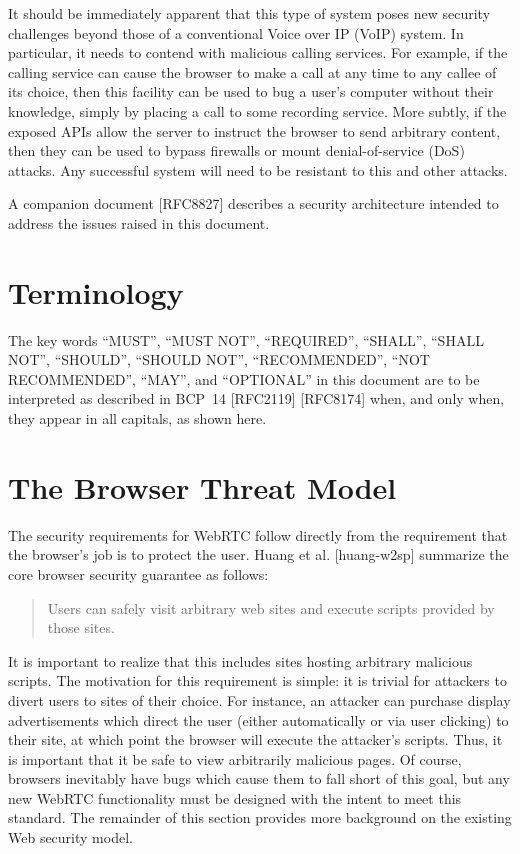 \documentclass{article}
\begin{document}
It should be immediately apparent that this type of system poses new
security challenges beyond those of a conventional Voice over IP (VoIP)
system.  In particular, it needs to contend with malicious calling
services.  For example, if the calling service can cause the browser to
make a call at any time to any callee of its choice, then this facility
can be used to bug a user's computer without their knowledge, simply by
placing a call to some recording service.  More subtly, if the exposed
APIs allow the server to instruct the browser to send arbitrary content,
then they can be used to bypass firewalls or mount denial-of-service
(DoS) attacks.  Any successful system will need to be resistant to this
and other attacks.

A companion document [RFC8827] describes a security architecture
intended to address the issues raised in this document.

\section{Terminology}

The key words ``MUST'', ``MUST NOT'', ``REQUIRED'', ``SHALL'', ``SHALL NOT'',
``SHOULD'', ``SHOULD NOT'', ``RECOMMENDED'', ``NOT RECOMMENDED'', ``MAY'', and
``OPTIONAL'' in this document are to be interpreted as described in
BCP~14 [RFC2119] [RFC8174] when, and only when, they appear in all
capitals, as shown here.

\section{The Browser Threat Model}

The security requirements for WebRTC follow directly from the
requirement that the browser's job is to protect the user.  Huang et
al. [huang-w2sp] summarize the core browser security guarantee as
follows:

\begin{quote}
Users can safely visit arbitrary web sites and execute scripts
provided by those sites.
\end{quote}

It is important to realize that this includes sites hosting arbitrary
malicious scripts.  The motivation for this requirement is simple: it
is trivial for attackers to divert users to sites of their choice.
For instance, an attacker can purchase display advertisements which
direct the user (either automatically or via user clicking) to their
site, at which point the browser will execute the attacker's scripts.
Thus, it is important that it be safe to view arbitrarily malicious
pages.  Of course, browsers inevitably have bugs which cause them to
fall short of this goal, but any new WebRTC functionality must be
designed with the intent to meet this standard.  The remainder of
this section provides more background on the existing Web security
model.
\end{document}
